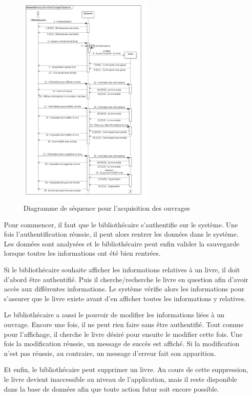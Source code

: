 \paragraph{}
\begin{figure}[h]
        \centering
        \includegraphics[width=0.6\textwidth]{acquisitionDesOuvragesSequence}
        \caption{Diagramme de séquence pour l'acquisition des ouvrages}
        \label{image-acquisitionDesOuvragesSequence}
        \end{figure}
\par
Pour commencer, il faut que le bibliothécaire s'authentifie sur le système.
Une fois l'authentification réussie, il peut alors rentrer les données dans le système.
Les données sont analysées et le bibliothécaire peut enfin valider la sauvegarde 
lorsque toutes les informations ont été bien rentrées. \par 
Si le bibliothécaire souhaite afficher les informations relatives à un livre, il doit d'abord 
être authentifié. Puis il cherche/recherche le livre en question afin d'avoir accès aux 
différentes informations. Le système vérifie alors les informations pour s'assurer que 
le livre existe avant d'en afficher toutes les informations y relatives. \par 
Le bibliothécaire a aussi le pouvoir de modifier les informations liées à un ouvrage.
Encore une fois, il ne peut rien faire sans être authentifié. Tout comme pour l'affichage, 
il cherche le livre désiré pour ensuite le modifier cette fois. Une fois la modification 
réussie, un message de succès est affiché. Si la modification n'est pas réussie, au 
contraire, un message d'erreur fait son apparition. \par 
Et enfin, le bibliothécaire peut supprimer un livre. Au cours de cette suppression, le livre
devient inaccessible au niveau de l'application, mais il reste disponible dans la base de 
données afin que toute action futur soit encore possible. \par
